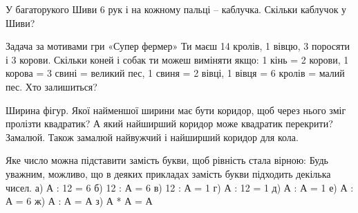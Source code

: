 \problem
У багаторукого Шиви 6 рук і на кожному пальці – каблучка.
Скільки каблучок у Шиви?


\problem
Задача за мотивами гри «Супер фермер»
Ти маєш 14 кролів, 1 вівцю, 3 поросяти і 3 корови. 
Скільки коней і собак ти можеш виміняти якщо: 
1 кінь = 2 корови, 
1 корова = 3 свині = великий пес, 
1 свиня = 2 вівці, 
1 вівця = 6 кролів = малий пес. 
Хто залишиться?


\problem
Ширина фігур.
Якої найменшої ширини має бути коридор,
щоб через нього зміг пролізти квадратик?
А який найширший коридор може квадратик перекрити?
Замалюй. Також замалюй найвужчий і найширший коридор для кола.


\problem
Яке число можна підставити замість букви, щоб рівність стала вірною:
Будь уважним, можливо, що в деяких прикладах замість букви підходить декілька чисел.
а) А : 12 = 6
б) 12 : А = 6
в) 12 : А = 1
г) А : 12 = 1
д) А : А = 1
е) А : А = 6
ж) А : А = А
з) А * А = А

